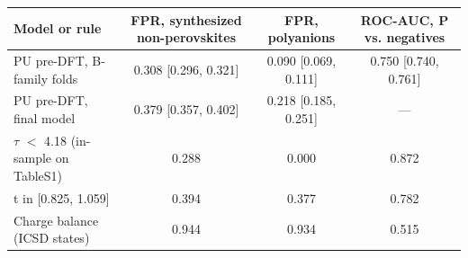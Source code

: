 \begin{tabular}{lccc}
\toprule
Model or rule & FPR, synthesized non-perovskites & FPR, polyanions & ROC-AUC, P vs. negatives \\
\midrule
PU pre-DFT, B-family folds & 0.308 [0.296, 0.321] & 0.090 [0.069, 0.111] & 0.750 [0.740, 0.761] \\
PU pre-DFT, final model & 0.379 [0.357, 0.402] & 0.218 [0.185, 0.251] & — \\
$\tau$ $<$ 4.18 (in-sample on TableS1) & 0.288 & 0.000 & 0.872 \\
t in [0.825, 1.059] & 0.394 & 0.377 & 0.782 \\
Charge balance (ICSD states) & 0.944 & 0.934 & 0.515 \\
\bottomrule
\end{tabular}
